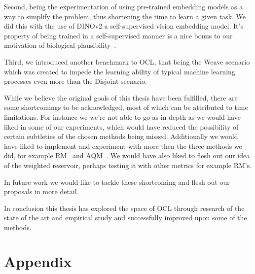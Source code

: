 \documentclass[oneside]{ctuthesis}
\begin{document}
Second, being the experimentation of using pre-trained embedding models as a way to simplify the problem, thus shortening the time to learn a given task. We did this with the use of DINOv2 a self-supervised vision embedding model. It's property of being trained in a self-supervised manner is a nice bonus to our motivation of biological plausibility~\cite{brain-self-supervised}.

Third, we introduced another benchmark to OCL, that being the Weave scenario which was created to impede the learning ability of typical machine learning processes even more than the Disjoint scenario.

While we believe the original goals of this thesis have been fulfilled, there are some shortcomings to be acknowledged, most of which can be attributed to time limitations. For instance we we're not able to go as in depth as we would have liked in some of our experiments, which would have reduced the possibility of certain subtleties of the chosen methods being missed. Additionally we would have liked to implement and experiment with more then the three methods we did, for example RM~\cite{RM} and AQM~\cite{AQM}. We would have also liked to flesh out our idea of the weighted reservoir, perhaps testing it with other metrics for example RM's.

In future work we would like to tackle these shortcoming and flesh out our proposals in more detail. 

In conclusion this thesis has explored the space of OCL through research of the state of the art and empirical study and successfully improved upon some of the methods.

\appendix

\chapter{Appendix}
\end{document}

